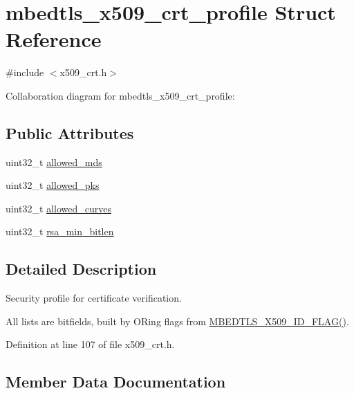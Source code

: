 \hypertarget{structmbedtls__x509__crt__profile}{}\section{mbedtls\+\_\+x509\+\_\+crt\+\_\+profile Struct Reference}
\label{structmbedtls__x509__crt__profile}


{\ttfamily \#include $<$x509\+\_\+crt.\+h$>$}



Collaboration diagram for mbedtls\+\_\+x509\+\_\+crt\+\_\+profile\+:
\subsection*{Public Attributes}
\begin{DoxyCompactItemize}
\item 
uint32\+\_\+t \mbox{\hyperlink{structmbedtls__x509__crt__profile_a1251640211d47c8e4b80b99d5b178685}{allowed\+\_\+mds}}
\item 
uint32\+\_\+t \mbox{\hyperlink{structmbedtls__x509__crt__profile_a13cba76eca3f0bce8a93b8f59fe69370}{allowed\+\_\+pks}}
\item 
uint32\+\_\+t \mbox{\hyperlink{structmbedtls__x509__crt__profile_a8149f4d17f3f465e2255f5af997e4c8e}{allowed\+\_\+curves}}
\item 
uint32\+\_\+t \mbox{\hyperlink{structmbedtls__x509__crt__profile_a094e9eb35ed5e9a16b67d2e8bd97e83c}{rsa\+\_\+min\+\_\+bitlen}}
\end{DoxyCompactItemize}


\subsection{Detailed Description}
Security profile for certificate verification.

All lists are bitfields, built by O\+Ring flags from \mbox{\hyperlink{group__x509__module_gaedcb73f1c615c266a348a0c62763c5de}{M\+B\+E\+D\+T\+L\+S\+\_\+\+X509\+\_\+\+I\+D\+\_\+\+F\+L\+A\+G()}}. 

Definition at line 107 of file x509\+\_\+crt.\+h.



\subsection{Member Data Documentation}
\mbox{\label{structmbedtls__x509__crt__profile_a8149f4d17f3f465e2255f5af997e4c8e}} 
